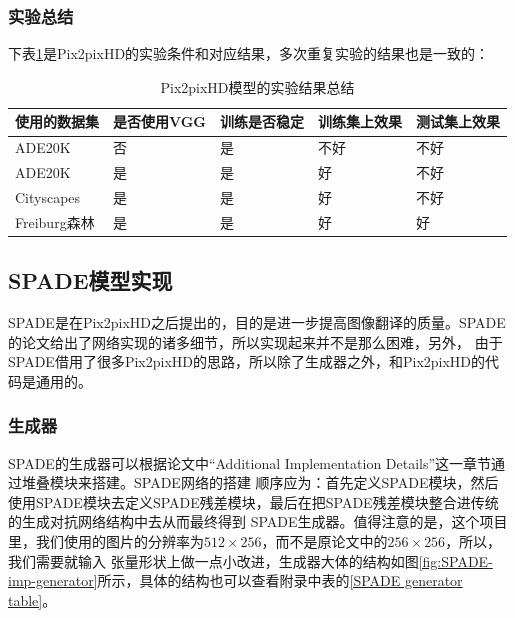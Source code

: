 \documentclass[supercite]{HustGraduPaper}
\theoremstyle{definition}
\begin{document}
\subsubsection{实验总结}

下表\ref{experimental results on Pix2pixHD}是Pix2pixHD的实验条件和对应结果，多次重复实验的结果也是一致的：
\begin{table}[H]
  \begin{center}
  \begin{tabular}{|l|l|l|l|l|}\hline\hline
  使用的数据集&是否使用VGG&训练是否稳定&训练集上效果&测试集上效果\\
  \hline
  ADE20K&否&是&不好&不好\\
  ADE20K&是&是&好&不好\\
  Cityscapes&是&是&好&不好\\
  Freiburg森林&是&是&好&好\\
  \hline\hline
  \end{tabular}
  \end{center}
  \caption{Pix2pixHD模型的实验结果总结}
  \label{experimental results on Pix2pixHD}
\end{table}

\subsection{SPADE模型实现}

SPADE是在Pix2pixHD之后提出的，目的是进一步提高图像翻译的质量。SPADE的论文给出了网络实现的诸多细节，所以实现起来并不是那么困难，另外，
由于SPADE借用了很多Pix2pixHD的思路，所以除了生成器之外，和Pix2pixHD的代码是通用的。

\subsubsection{生成器}

SPADE的生成器可以根据论文\cite{park2019SPADE}中“Additional Implementation Details”这一章节通过堆叠模块来搭建。SPADE网络的搭建
顺序应为：首先定义SPADE模块，然后使用SPADE模块去定义SPADE残差模块，最后在把SPADE残差模块整合进传统的生成对抗网络结构中去从而最终得到
SPADE生成器。值得注意的是，这个项目里，我们使用的图片的分辨率为$512\times256$，而不是原论文中的$256\times256$，所以，我们需要就输入
张量形状上做一点小改进，生成器大体的结构如图\ref{fig:SPADE-imp-generator}所示，具体的结构也可以查看附录中表的\ref{SPADE generator table}。
\end{document}
